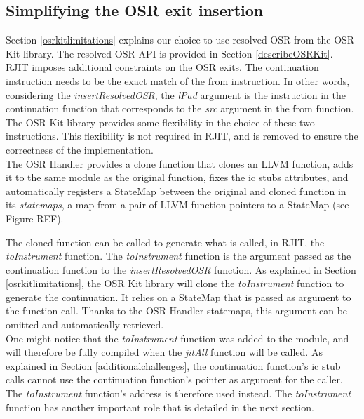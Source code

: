 
\subsection{Simplifying the OSR exit insertion}

Section \ref{osrkitlimitations} explains our choice to use resolved OSR from the OSR Kit\cite{OSRKit} library.
The resolved OSR API is provided in Section \ref{describeOSRKit}.\\

RJIT imposes additional constraints on the OSR exits. 
The continuation instruction needs to be the exact match of the from instruction.
In other words, considering the \textit{insertResolvedOSR}, the \textit{lPad} argument is the instruction in the continuation function that corresponds to the \textit{src} argument in the from function.
The OSR Kit library provides some flexibility in the choice of these two instructions. 
This flexibility is not required in RJIT, and is removed to ensure the correctness of the implementation.\\

The OSR Handler provides a clone function that clones an LLVM function, adds it to the same module as the original function, fixes the ic stubs attributes, and automatically registers a StateMap between the original and cloned function in its \textit{statemaps}, a map from a pair of LLVM function pointers to a StateMap (see Figure REF).\\

The cloned function can be called to generate what is called, in RJIT, the \textit{toInstrument} function.
The \textit{toInstrument} function is the argument passed as the continuation function to the \textit{insertResolvedOSR} function.
As explained in Section \ref{osrkitlimitations}, the OSR Kit library will clone the \textit{toInstrument} function to generate the continuation.
It relies on a StateMap that is passed as argument to the function call. 
Thanks to the OSR Handler statemaps, this argument can be omitted and automatically retrieved.\\

One might notice that the \textit{toInstrument} function was added to the module, and will therefore be fully compiled when the \textit{jitAll} function will be called.
As explained in Section \ref{additionalchallenges}, the continuation function's ic stub calls cannot use the continuation function's pointer as argument for the caller. 
The \textit{toInstrument} function's address is therefore used instead.
The \textit{toInstrument} function has another important role that is detailed in the next section.\\

